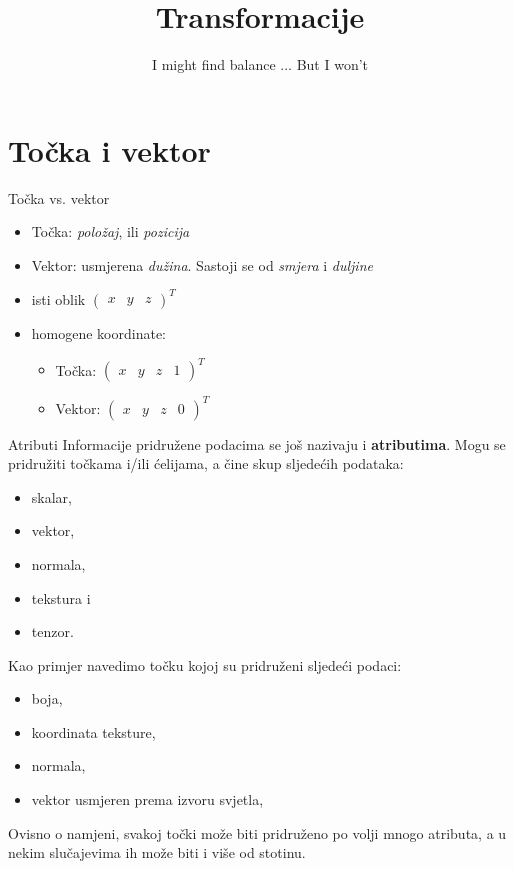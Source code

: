 \documentclass[9pt]{beamer}
\title{Transformacije}
\subtitle{ I might find balance $\ldots$ But I won't}
\institute{Računalna grafika}
\begin{document}
\begin{frame}
 \titlepage
\end{frame}

\section{Točka i vektor}

\begin{frame}{Točka vs. vektor}
	\begin{itemize}
		\item Točka: \textit{položaj}, ili \textit{pozicija}
		\item Vektor: usmjerena \textit{dužina}. Sastoji se od \textit{smjera} i \textit{duljine} 
		\item isti oblik $\begin{pmatrix} x & y & z\end{pmatrix}^T$ 
		\item homogene koordinate:
		\begin{itemize}
			\item Točka: $\begin{pmatrix} x & y & z & 1\end{pmatrix}^T$
			\item Vektor: $\begin{pmatrix} x & y & z & 0\end{pmatrix}^T$
		\end{itemize}
	\end{itemize}
\end{frame}


\begin{frame}{Atributi}
	Informacije pridružene podacima se još nazivaju i \textbf{atributima}.
	Mogu se pridružiti točkama i/ili ćelijama, a čine skup sljedećih podataka:
	\begin{itemize}
		\item skalar,
		\item vektor,
		\item normala,
		\item tekstura i 
		\item tenzor.
	\end{itemize}
	Kao primjer navedimo točku kojoj su pridruženi sljedeći podaci:
	\begin{itemize}
		\item boja,
		\item koordinata teksture,
		\item normala,
		\item vektor usmjeren prema izvoru svjetla,
	\end{itemize}
	Ovisno o namjeni, svakoj točki može biti pridruženo po volji mnogo atributa, a u nekim slučajevima ih može biti i više od stotinu.
\end{frame}
\end{document}
